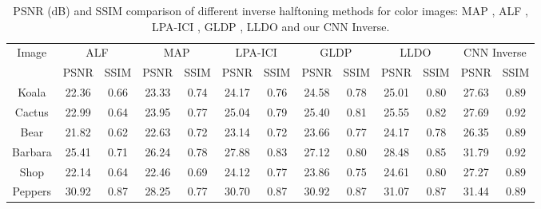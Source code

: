 \documentclass[journal]{IEEEtran}
\begin{document}
\begin{table*}[!htb]
\centering
\caption{PSNR (dB) and SSIM comparison of different inverse halftoning methods for color images: MAP \cite{stevenson1997inverse}, ALF \cite{kite2000fast}, LPA-ICI \cite{foi2004inverse}, GLDP \cite{son2012inverse}, LLDO \cite{son2014local} and our CNN Inverse.}
\label{table:color_other_inverse}
\begin{tabular}{c|c|c|c|c|c|c|c|c|c|c|c|c}
\hline
\multirow{2}{*}{Image} & \multicolumn{2}{c|}{ALF} & \multicolumn{2}{c|}{MAP} & \multicolumn{2}{c|}{LPA-ICI} & \multicolumn{2}{c|}{GLDP} & \multicolumn{2}{c|}{LLDO} & \multicolumn{2}{c}{CNN Inverse} \\ \cline{2-13} 
                       & PSNR        & SSIM       & PSNR        & SSIM       & PSNR          & SSIM         & PSNR        & SSIM        & PSNR         & SSIM       & PSNR            & SSIM           \\ \hline
Koala                  & 22.36       & 0.66       & 23.33       & 0.74       & 24.17         & 0.76         & 24.58       & 0.78       & 25.01        & 0.80       & 27.63           & 0.89           \\ \hline
Cactus                 & 22.99       & 0.64       & 23.95       & 0.77       & 25.04         & 0.79         & 25.40       & 0.81        & 25.55        & 0.82       & 27.69           & 0.92           \\ \hline
Bear                   & 21.82       & 0.62       & 22.63       & 0.72       & 23.14         & 0.72         & 23.66       & 0.77        & 24.17        & 0.78       & 26.35           & 0.89           \\ \hline
Barbara                & 25.41       & 0.71       & 26.24       & 0.78       & 27.88         & 0.83         & 27.12       & 0.80        & 28.48        & 0.85       & 31.79           & 0.92           \\ \hline
Shop                   & 22.14       & 0.64       & 22.46       & 0.69       & 24.12         & 0.77         & 23.86       & 0.75        & 24.61        & 0.80       & 27.27           & 0.89           \\ \hline
Peppers                & 30.92       & 0.87       & 28.25       & 0.77       & 30.70         & 0.87         & 30.92       & 0.87        & 31.07        & 0.87       & 31.44           & 0.89           \\ \hline
\end{tabular}
\end{table*}
\end{document}
